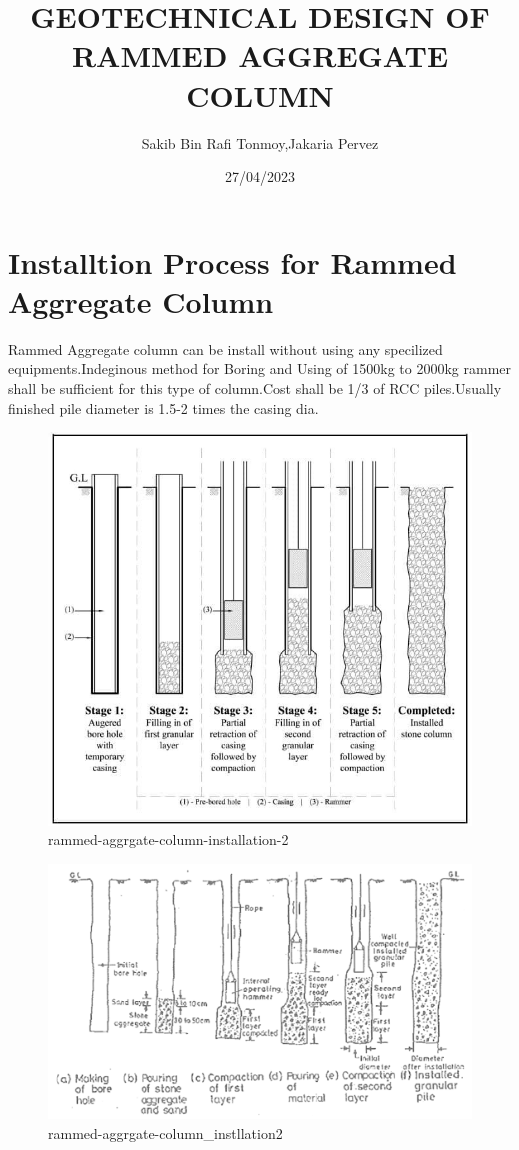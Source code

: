 \documentclass[12pt]{article}
\title{GEOTECHNICAL DESIGN OF RAMMED AGGREGATE COLUMN}
\author{Sakib Bin Rafi Tonmoy,Jakaria Pervez}
\date{27/04/2023}
\begin{document}
\maketitle

\section{Installtion Process for Rammed Aggregate Column }
 Rammed Aggregate column  can be install without using any specilized equipments.Indeginous method for Boring and Using of 1500kg to 2000kg rammer shall be sufficient for this type of column.Cost shall be 1/3 of RCC piles.Usually finished pile diameter is 1.5-2 times the casing dia.
  \\


\begin{figure}[h]
\centering
\includegraphics[height=0.5\textwidth]{stone-column-installation}
\caption{rammed-aggrgate-column-installation-2}
\label{fig:ragc_installation}
\end{figure}



 
\begin{figure}[h]
\centering
\includegraphics[height=0.5\textwidth]{Rammed_Aggret_Pile_Instalation_2}
\caption{rammed-aggrgate-column_instllation2}
\label{fig:ragc_installation2}
\end{figure}
\end{document}

